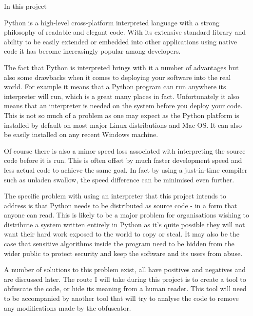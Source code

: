 \documentclass{report}
\begin{document}
In this project

Python is a high-level cross-platform interpreted language with a
strong philosophy of readable and elegant code. With its extensive
standard library and ability to be easily extended or embedded into
other applications using native code it has become increasingly
popular among developers.

The fact that Python is interpreted brings with it a number of
advantages but also some drawbacks when it comes to deploying your
software into the real world. For example it means that a Python
program can run anywhere its interpreter will run, which is a great
many places in fact. Unfortunately it also means that an
interpreter is needed on the system before you deploy your code.
This is not so much of a problem as one may expect as the Python
platform is installed by default on most major Linux distributions
and Mac OS. It can also be easily installed on any recent Windows
machine.

Of course there is also a minor speed loss associated with
interpreting the source code before it is run. This is often offset
by much faster development speed and less actual code to achieve
the same goal. In fact by using a just-in-time compiler such as
unladen swallow, the speed difference can be minimised even
further.

The specific problem with using an interpreter that this project
intends to address is that Python needs to be distributed as source
code - in a form that anyone can read. This is likely to be a major
problem for organisations wishing to distribute a system written
entirely in Python as it's quite possible they will not want their
hard work exposed to the world to copy or steal. It may also be the
case that sensitive algorithms inside the program need to be hidden
from the wider public to protect security and keep the software and
its users from abuse.

A number of solutions to this problem exist, all have positives and
negatives and are discussed later. The route I will take during
this project is to create a tool to obfuscate the code, or hide its
meaning from a human reader. This tool will need to be accompanied
by another tool that will try to analyse the code to remove any
modifications made by the obfuscator.
\end{document}
